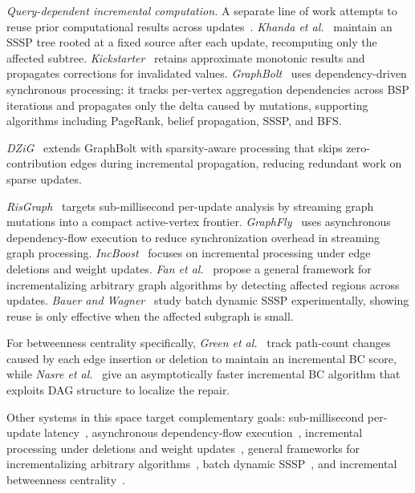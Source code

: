 \textit{Query-dependent incremental computation.}
A separate line of work attempts to reuse prior computational results
across updates~\cite{besta2021practice,ramalingam1996computational}.
\textit{Khanda et al.}~\cite{khanda2021parallel} maintain an SSSP
tree rooted at a fixed source after each update, recomputing only the
affected subtree.
\textit{Kickstarter}~\cite{vora2017kickstarter} retains approximate monotonic
results and propagates corrections for invalidated values.
\textit{GraphBolt}~\cite{mariappan2019graphbolt} uses dependency-driven
synchronous processing: it tracks per-vertex aggregation dependencies across
BSP iterations and propagates only the delta caused by mutations, supporting
algorithms including PageRank, belief propagation, SSSP, and BFS.

\textit{DZiG}~\cite{mariappan2021dzig} extends GraphBolt with sparsity-aware
processing that skips zero-contribution edges during incremental propagation,
reducing redundant work on sparse updates.
\begin{maybecut}
\textit{RisGraph}~\cite{feng2021risgraph} targets sub-millisecond per-update
analysis by streaming graph mutations into a compact active-vertex frontier.
\textit{GraphFly}~\cite{chen2022graphfly} uses asynchronous dependency-flow
execution to reduce synchronization overhead in streaming graph processing.
\textit{IncBoost}~\cite{yin2024incboost} focuses on incremental processing
under edge deletions and weight updates.
\textit{Fan et al.}~\cite{fan2021incrementalizing} propose a general framework
for incrementalizing arbitrary graph algorithms by detecting affected
regions across updates.
\textit{Bauer and Wagner}~\cite{bauer2009batch} study batch dynamic SSSP
experimentally, showing reuse is only effective when the affected
subgraph is small.

For betweenness centrality specifically, \textit{Green et al.}~\cite{green2012fast}
track path-count changes caused by each edge insertion or deletion to maintain
an incremental BC score, while \textit{Nasre et al.}~\cite{Nasre2014IncBC}
give an asymptotically faster incremental BC algorithm that exploits DAG structure
to localize the repair.
\end{maybecut}
\begin{fixed}
Other systems in this space target complementary goals: sub-millisecond
per-update latency~\cite{feng2021risgraph}, asynchronous dependency-flow
execution~\cite{chen2022graphfly}, incremental processing under deletions
and weight updates~\cite{yin2024incboost}, general frameworks for
incrementalizing arbitrary algorithms~\cite{fan2021incrementalizing},
batch dynamic SSSP~\cite{bauer2009batch}, and incremental betweenness
centrality~\cite{green2012fast,Nasre2014IncBC}.
\end{fixed}
